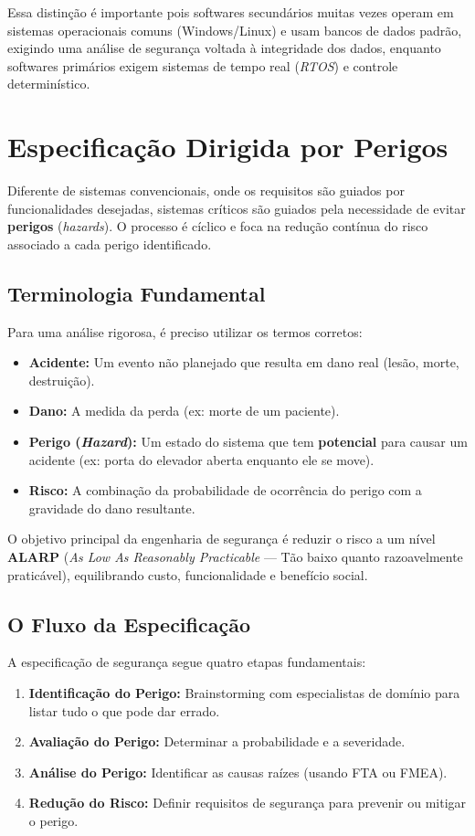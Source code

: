 \documentclass[12pt,a4paper,twoside]{report}
\begin{document}
Essa distinção é importante pois softwares secundários muitas vezes operam em sistemas operacionais comuns (Windows/Linux) e usam bancos de dados padrão, exigindo uma análise de segurança voltada à integridade dos dados, enquanto softwares primários exigem sistemas de tempo real (\emph{RTOS}) e controle determinístico.

\section{Especificação Dirigida por Perigos}

Diferente de sistemas convencionais, onde os requisitos são guiados por funcionalidades desejadas, sistemas críticos são guiados pela necessidade de evitar \textbf{perigos} (\emph{hazards}). O processo é cíclico e foca na redução contínua do risco associado a cada perigo identificado.

\subsection{Terminologia Fundamental}
Para uma análise rigorosa, é preciso utilizar os termos corretos:
\begin{itemize}
    \item \textbf{Acidente:} Um evento não planejado que resulta em dano real (lesão, morte, destruição).
    \item \textbf{Dano:} A medida da perda (ex: morte de um paciente).
    \item \textbf{Perigo (\textit{Hazard}):} Um estado do sistema que tem \textbf{potencial} para causar um acidente (ex: porta do elevador aberta enquanto ele se move).
    \item \textbf{Risco:} A combinação da probabilidade de ocorrência do perigo com a gravidade do dano resultante.
\end{itemize}

O objetivo principal da engenharia de segurança é reduzir o risco a um nível \textbf{ALARP} (\emph{As Low As Reasonably Practicable} --- Tão baixo quanto razoavelmente praticável), equilibrando custo, funcionalidade e benefício social.

\subsection{O Fluxo da Especificação}
A especificação de segurança segue quatro etapas fundamentais:

\begin{enumerate}
    \item \textbf{Identificação do Perigo:} Brainstorming com especialistas de domínio para listar tudo o que pode dar errado.
    \item \textbf{Avaliação do Perigo:} Determinar a probabilidade e a severidade.
    \item \textbf{Análise do Perigo:} Identificar as causas raízes (usando FTA ou FMEA).
    \item \textbf{Redução do Risco:} Definir requisitos de segurança para prevenir ou mitigar o perigo.
\end{enumerate}
\end{document}
